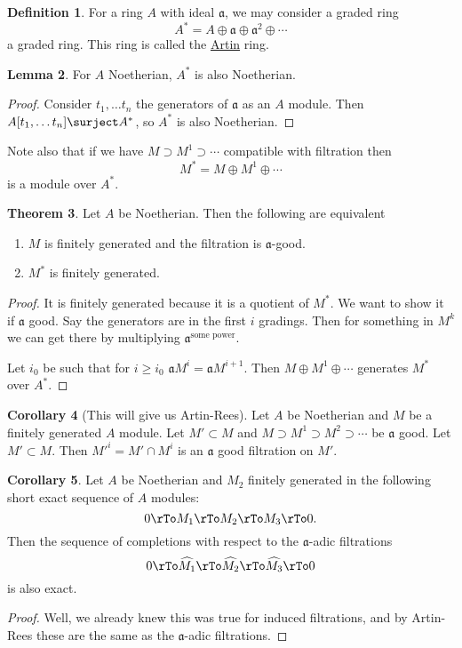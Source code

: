 \documentclass[12 pt]{article}
\theoremstyle{definition}
\newtheorem{thm}{Theorem}[section]
\newtheorem{cor}[thm]{Corollary}
\newtheorem{lemma}[thm]{Lemma}
\newtheorem{defn}[thm]{Definition}
\renewcommand{\(}{\left(}
\renewcommand{\)}{\right)}
\newcommand\fa{{\mathfrak a}}
\begin{document}
\begin{defn}
For a ring $A$ with ideal $\fa$, we may consider a graded ring
\[A^*=A \oplus \fa \oplus \fa^2 \oplus \cdots\]
a graded ring. This ring is called the \underline{Artin} ring.
\end{defn}

\begin{lemma} For $A$ Noetherian, $A^*$ is also Noetherian.
\end{lemma}
\begin{proof} Consider $t_1, \ldots t_n$ the generators of $\fa$ as an $A$ module. Then $A[t_1, \ldots t_n] \surject A^*$, so $A^*$ is also Noetherian.
\end{proof}

Note also that if we have $M \supset M^1 \supset \cdots$ compatible with filtration then
\[M^*=M \oplus M^1 \oplus \cdots\]
is a module over $A^*$.



\begin{thm} Let $A$ be Noetherian. Then the following are equivalent
\begin{enumerate}
\item $M$ is finitely generated and the filtration is $\fa$-good.
\item $M^*$ is finitely generated.
\end{enumerate}
\end{thm}

\begin{proof}

 It is finitely generated because it is a quotient of $M^*$. We want to show it if $\fa$ good. Say the generators are in the first $i$ gradings. Then for something in $M^k$ we can get there by multiplying $\fa^\text{some power}$.

 Let $i_0$ be such that for $i \geq i_0$ $\fa M^i=\fa M^{i+1}$. Then $M \oplus M^1 \oplus \cdots$ generates $M^*$ over $A^*$.
\end{proof}

\begin{cor} [This will give us Artin-Rees] Let $A$ be Noetherian and $M$ be a finitely generated $A$ module. Let $M' \subset M$ and $M \supset M^1 \supset M^2 \supset \cdots $ be $\fa$ good. Let $M' \subset M$. Then $M'^i=M'\cap M^i$ is an $\fa$ good filtration on $M'$.
\end{cor}

\begin{cor} Let $A$ be Noetherian and $M_2$ finitely generated in the following short exact sequence of $A$ modules:
\[0 \rTo M_1 \rTo M_2 \rTo M_3 \rTo 0.\]
Then the sequence of completions with respect to the $\fa$-adic filtrations
\[0 \rTo \widehat{M_1} \rTo \widehat{M_2} \rTo \widehat{M_3} \rTo 0\]
is also exact.
\label{adic copmletion exact}
\end{cor}
\begin{proof} Well, we already knew this was true for induced filtrations, and by Artin-Rees these are the same as the $\fa$-adic filtrations.
\end{proof}
\end{document}
